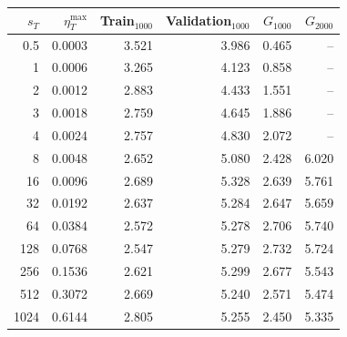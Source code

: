 \begin{tabular}{rrrrrr}
\toprule
$s_T$ & $\eta_T^{\max}$ & Train$_{1000}$ & Validation$_{1000}$ & $G_{1000}$ & $G_{2000}$ \\
\midrule
0.5 & 0.0003 & 3.521 & 3.986 & 0.465 & -- \\
1 & 0.0006 & 3.265 & 4.123 & 0.858 & -- \\
2 & 0.0012 & 2.883 & 4.433 & 1.551 & -- \\
3 & 0.0018 & 2.759 & 4.645 & 1.886 & -- \\
4 & 0.0024 & 2.757 & 4.830 & 2.072 & -- \\
8 & 0.0048 & 2.652 & 5.080 & 2.428 & 6.020 \\
16 & 0.0096 & 2.689 & 5.328 & 2.639 & 5.761 \\
32 & 0.0192 & 2.637 & 5.284 & 2.647 & 5.659 \\
64 & 0.0384 & 2.572 & 5.278 & 2.706 & 5.740 \\
128 & 0.0768 & 2.547 & 5.279 & 2.732 & 5.724 \\
256 & 0.1536 & 2.621 & 5.299 & 2.677 & 5.543 \\
512 & 0.3072 & 2.669 & 5.240 & 2.571 & 5.474 \\
1024 & 0.6144 & 2.805 & 5.255 & 2.450 & 5.335 \\
\bottomrule
\end{tabular}
